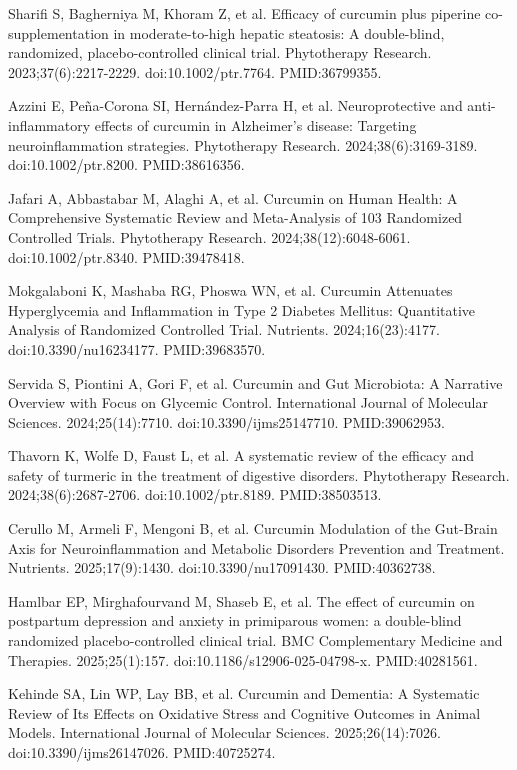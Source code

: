 \documentclass[12pt,oneside]{book}
\newcommand{\reff}[2]{\par\hangindent=7mm\hangafter=1\noindent[#1]\hspace{2mm}#2\par}
\begin{document}
\reff{28}{Sharifi S, Bagherniya M, Khoram Z, et al. Efficacy of curcumin plus piperine co-supplementation in moderate-to-high hepatic steatosis: A double-blind, randomized, placebo-controlled clinical trial. Phytotherapy Research. 2023;37(6):2217-2229. doi:10.1002/ptr.7764. PMID:36799355.}

\reff{29}{Azzini E, Peña-Corona SI, Hernández-Parra H, et al. Neuroprotective and anti-inflammatory effects of curcumin in Alzheimer's disease: Targeting neuroinflammation strategies. Phytotherapy Research. 2024;38(6):3169-3189. doi:10.1002/ptr.8200. PMID:38616356.}

\reff{30}{Jafari A, Abbastabar M, Alaghi A, et al. Curcumin on Human Health: A Comprehensive Systematic Review and Meta-Analysis of 103 Randomized Controlled Trials. Phytotherapy Research. 2024;38(12):6048-6061. doi:10.1002/ptr.8340. PMID:39478418.}

\reff{31}{Mokgalaboni K, Mashaba RG, Phoswa WN, et al. Curcumin Attenuates Hyperglycemia and Inflammation in Type 2 Diabetes Mellitus: Quantitative Analysis of Randomized Controlled Trial. Nutrients. 2024;16(23):4177. doi:10.3390/nu16234177. PMID:39683570.}

\reff{32}{Servida S, Piontini A, Gori F, et al. Curcumin and Gut Microbiota: A Narrative Overview with Focus on Glycemic Control. International Journal of Molecular Sciences. 2024;25(14):7710. doi:10.3390/ijms25147710. PMID:39062953.}

\reff{33}{Thavorn K, Wolfe D, Faust L, et al. A systematic review of the efficacy and safety of turmeric in the treatment of digestive disorders. Phytotherapy Research. 2024;38(6):2687-2706. doi:10.1002/ptr.8189. PMID:38503513.}

\reff{34}{Cerullo M, Armeli F, Mengoni B, et al. Curcumin Modulation of the Gut-Brain Axis for Neuroinflammation and Metabolic Disorders Prevention and Treatment. Nutrients. 2025;17(9):1430. doi:10.3390/nu17091430. PMID:40362738.}

\reff{35}{Hamlbar EP, Mirghafourvand M, Shaseb E, et al. The effect of curcumin on postpartum depression and anxiety in primiparous women: a double-blind randomized placebo-controlled clinical trial. BMC Complementary Medicine and Therapies. 2025;25(1):157. doi:10.1186/s12906-025-04798-x. PMID:40281561.}

\reff{36}{Kehinde SA, Lin WP, Lay BB, et al. Curcumin and Dementia: A Systematic Review of Its Effects on Oxidative Stress and Cognitive Outcomes in Animal Models. International Journal of Molecular Sciences. 2025;26(14):7026. doi:10.3390/ijms26147026. PMID:40725274.}
\end{document}
